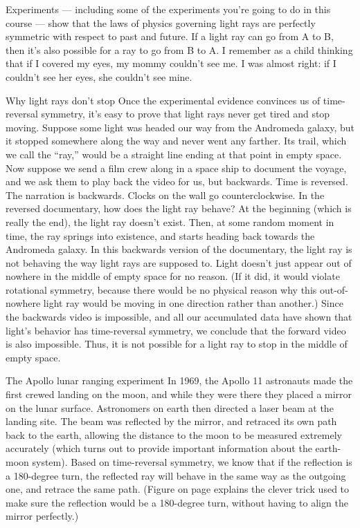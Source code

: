 Experiments --- including some of the experiments you're going to do in this
course --- show that the laws of physics governing light rays are perfectly
symmetric with respect to past and future. If a light ray can go from A to
B, then it's also possible for a ray to go from B to A. I remember as a child
thinking that if I covered my eyes, my mommy couldn't see me. I was almost
right: if I couldn't see her eyes, she couldn't see mine. 

\begin{eg}{Why light rays don't stop}\label{eg:tiredlight}
Once the experimental evidence convinces us of time-reversal symmetry, it's
easy to prove that light rays never get tired and stop moving. Suppose
some light was headed our way from the Andromeda galaxy, but it
stopped somewhere along the way and never went any farther. Its trail,
which we call the ``ray,'' would be a straight line ending at that
point in empty space. Now suppose we send a film crew along in a space ship to document
the voyage, and we ask them to play back the video for us, but backwards.
Time is reversed. The narration is backwards. Clocks on the wall go counterclockwise.
In the reversed documentary, how does the light ray behave? At the beginning
(which is really the end), the light ray doesn't exist. Then, at some random moment
in time, the ray springs into existence, and starts heading back towards the
Andromeda galaxy. In this backwards version of the documentary, the light ray
is not behaving the way light rays are supposed to. Light doesn't just appear
out of nowhere in the middle of empty space for no reason. (If it did, it would
violate rotational symmetry, because there would be no physical reason why this
out-of-nowhere light ray would be moving in one direction rather than another.)
Since the backwards video is impossible, and all our accumulated data have shown that
light's behavior has time-reversal symmetry, we conclude that the forward video is
also impossible. Thus, it is not possible for a light ray to stop in the middle of empty
space.
\end{eg}

\begin{eg}{The Apollo lunar ranging experiment}\label{eg:lunarranging}
In 1969, the Apollo 11 astronauts made the first crewed landing on the moon, and
while they were there they placed a mirror on the lunar surface. Astronomers
on earth then directed a laser beam at the landing site. The beam was reflected
by the mirror, and retraced its own path back to the earth, allowing the distance
to the moon to be measured extremely accurately (which turns out to provide important
information about the earth-moon system). Based on time-reversal symmetry,
we know that if the reflection is a 180-degree
turn, the reflected ray will behave in the same way as the outgoing one, and retrace
the same path. (Figure  on page
\pageref{fig:cornerreflector} explains the clever trick used to make sure the reflection
would be a 180-degree turn, without having to align the mirror perfectly.)
\end{eg}

